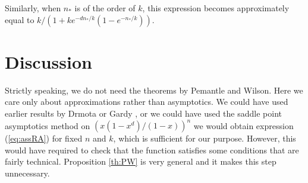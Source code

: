 \documentclass{article}
\begin{document}
Similarly, when $n_*$ is of the order of $k$, this expression becomes
approximately equal to $k/(1+ke^{-dn_*/k}(1-e^{-n_*/k}))$.

\section{Discussion}

Strictly speaking, we do not need the theorems by Pemantle and Wilson.
Here we care only about approximations rather than asymptotics. We could
have used earlier results by Drmota \cite{Drmota1994} or Gardy
\cite{Gardy1995}, or we could have used the saddle point asymptotics
method on $(x(1-x^d)/(1-x))^n$ we would obtain expression (\ref{eq:assRA})
for fixed $n$ and $k$, which is sufficient for our purpose. However, this
would have required to check that the function satisfies some conditions
that are fairly technical. Proposition \ref{th:PW} is very general and it
makes this step unnecessary.





\end{document}
